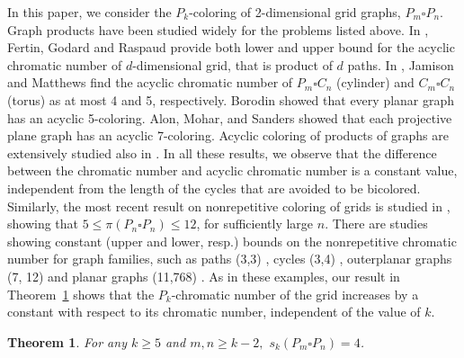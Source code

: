 \documentclass[
final, nomarks
]{dmtcs-episciences}
\newtheorem{theorem}{Theorem}
\begin{document}
In this paper, we consider the $P_k$-coloring of 2-dimensional grid graphs, $P_m\square P_n$. Graph products have been studied widely for the problems listed above. In \cite{fertin2003acyclic}, Fertin, Godard and Raspaud provide both lower and upper bound for the acyclic chromatic number of $d$-dimensional grid, that is product of $d$ paths. In \cite{jamison2008acycliccycles}, Jamison and Matthews find the acyclic chromatic number of $P_m\square C_n$ (cylinder) and $C_m\square C_n$ (torus) as at most 4 and 5, respectively. Borodin \cite{borodin1979acyclic} showed that every planar graph has an acyclic 5-coloring. Alon, Mohar, and Sanders \cite{alon1996acyclic} showed that each projective plane graph has an acyclic 7-coloring. Acyclic coloring of products of graphs are extensively studied also in \cite{jamison2006acyclic, jamison2008acyclic}. 
In all these results, we observe that the difference between the chromatic number and acyclic chromatic number is a constant value, independent from the length of the cycles that are avoided to be bicolored. Similarly, 
the most recent result on nonrepetitive coloring of grids is studied in \cite{tao2026nonrepetitive}, showing that 
$5\leq \pi(P_n\square P_n)\leq 12$, for sufficiently large $n$. 
There are studies showing constant (upper and lower, resp.) bounds on the nonrepetitive chromatic number for graph families, such as paths (3,3) \cite{thue1906uber}, cycles (3,4) \cite{currie2002there}, outerplanar graphs (7, 12) \cite{barat2007square,barat2008square,kundgen2008nonrepetitive} and planar graphs (11,768) \cite{dujmovic2013nonrepetitive,dujmovic2020planar}. 
As in these examples, our result in Theorem~\ref{thm_sk} shows that the $P_k$-chromatic number of the grid increases by a constant with respect to its chromatic number, independent of the value of $k$.
\begin{theorem}\label{thm_sk}
For any $k\geq 5$ and $m, n\geq k-2,$ $s_k(P_m\square P_n)=4$. 
\end{theorem}
\end{document}
